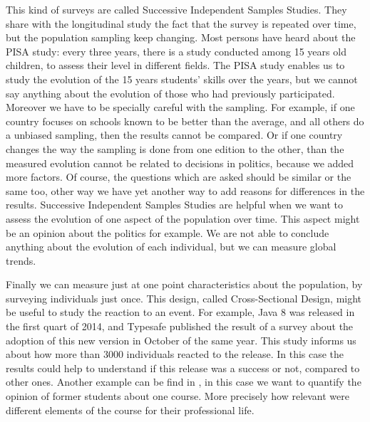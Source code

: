 \documentclass{report}
\begin{document}
This kind of surveys are called Successive Independent Samples Studies. They share with the longitudinal study the fact that the survey is repeated over time, but the population sampling keep changing. Most persons have heard about the PISA study: every three years, there is a study conducted among 15 years old children, to assess their level in different fields. The PISA study enables us to study the evolution of the 15 years students' skills over the years, but we cannot say anything about the evolution of those who had previously participated. Moreover we have to be specially careful with the sampling. For example, if one country focuses on schools known to be better than the average, and all others do a unbiased sampling, then the results cannot be compared.  Or if one country changes the way the sampling is done from one edition to the other, than the measured evolution cannot be related to decisions in politics, because we added more factors. Of course, the questions which are asked should be similar or the same too, other way we have yet another way to add reasons for differences in the results.
Successive Independent Samples Studies are helpful when we want to assess the evolution of one aspect of the population over time. This aspect might be an opinion about the politics for example. We are not able to conclude anything about the evolution of each individual, but we can measure global trends.

Finally we can measure just at one point characteristics about the population, by surveying individuals just once. This design, called Cross-Sectional Design, might be useful to study the reaction to an event. For example, Java 8 was released in the first quart of 2014, and Typesafe published the result of a survey about the adoption of this new version in October of the same year. This study informs us about how more than 3000 individuals reacted to the release. In this case the results could help to understand if this release was a success or not, compared to other ones. Another example can be find in \cite{DBLP:dblp_conf/er/TortOP13}, in this case we want to quantify the opinion of former students about one course. More precisely how relevant were different elements of the course for their professional life.
\end{document}
